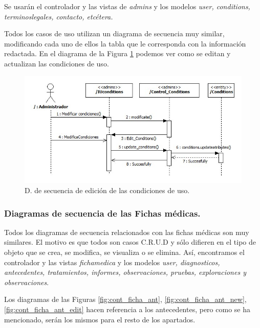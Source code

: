 					Se usarán el controlador y las vistas de \textit{admins} y los modelos \textit{user, conditions, terminoslegales, contacto, etcétera.}
					
					Todos los casos de uso utilizan un diagrama de secuencia muy similar, modificando cada uno de ellos la tabla que le corresponda con la información redactada. En el diagrama de la Figura \ref{fig:cont_admin_condition} podemos ver como se editan y actualizan las condiciones de uso.
					
					\begin{figure}[H]
					  \centering
					    \includegraphics[width=14cm]{img/jpg/secuencia/17_admins_condition.jpg}
					  \caption{D. de secuencia de edición de las condiciones de uso.}
					  \label{fig:cont_admin_condition}
					\end{figure}
				
				


			\subsubsection{Diagramas de secuencia de las Fichas médicas.} %
			\label{par:diagramas_de_secuencia_de_las_fichas_medicas}
			
				Todos los diagramas de secuencia relacionados con las fichas médicas son muy similares. El motivo es que todos son casos C.R.U.D y sólo difieren en el tipo de objeto que se crea, se modifica, se visualiza o se elimina. Así, encontramos el controlador y las vistas \textit{fichamedica} y los modelos \textit{user, diagnosticos, antecedentes, tratamientos, informes, observaciones, pruebas, exploraciones y observaciones}.
				
				Los diagramas de las Figuras \ref{fig:cont_ficha_ant}, \ref{fig:cont_ficha_ant_new}, \ref{fig:cont_ficha_ant_edit} hacen referencia a los antecedentes, pero como se ha mencionado, serán los mismos para el resto de los apartados.
				
